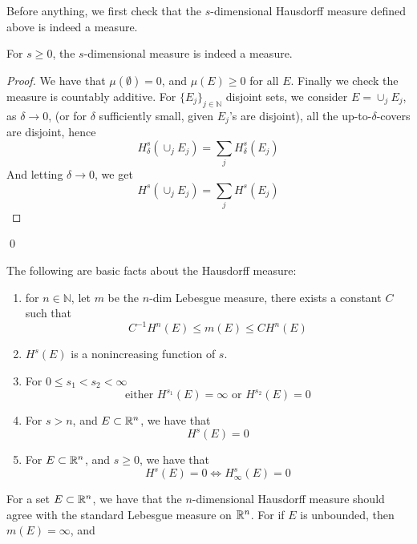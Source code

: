 Before anything, we first check that the $s$-dimensional Hausdorff measure defined above is indeed a measure.
\begin{proposition}
    For $s\geq 0$, the $s$-dimensional measure is indeed a measure.
\end{proposition}
\begin{proof}
    We have that $\mu(\emptyset)=0$, and $\mu(E)\geq 0$ for all $E$. Finally we check the measure is countably additive. For $\{E_j\}_{j\in\mathbb{N}}$ disjoint sets, we consider $E=\cup_jE_j$, as $\delta\to 0$, (or for $\delta$ sufficiently small, given $E_j$'s are disjoint), all the up-to-$\delta$-covers are disjoint, hence
    \begin{equation*}
        H_\delta^s(\cup_jE_j)=\sum_j H_\delta^s(E_j)
    \end{equation*}
    And letting $\delta\to 0$, we get
    \begin{equation*}
        H^s(\cup_jE_j)=\sum_jH^s(E_j)
    \end{equation*}
\end{proof}
\qed

\begin{proposition}
    The following are basic facts about the Hausdorff measure:
    \begin{enumerate}
        \item for $n\in\mathbb{N}$, let $m$ be the $n$-dim Lebesgue measure, there exists a constant $C$ such that
        \begin{equation*}
            C^{-1}H^n(E)\leq m(E)\leq CH^n(E)
        \end{equation*}
        \item $H^s(E)$ is a nonincreasing function of $s$.
        \item For $0\leq s_1<s_2<\infty$
        \begin{equation*}
            \text{either } H^{s_1}(E)=\infty \text{ or } H^{s_2}(E)=0
        \end{equation*}
        \item For $s>n$, and $E\subset\mathbb{R}^n$, we have that
        \begin{equation*}
            H^s(E)=0
        \end{equation*}
        \item For $E\subset\mathbb{R}^n$, and $s\geq 0$, we have that
        \begin{equation*}
            H^s(E)=0 \iff H_\infty^s(E)=0
        \end{equation*}
    \end{enumerate}
\end{proposition}
\begin{example}
    For a set $E\subset\mathbb{R}^n$, we have that the $n$-dimensional Hausdorff measure should agree with the standard Lebesgue measure on $\mathbb{R}^n$. For if $E$ is unbounded, then $m(E)=\infty$, and 
\end{example}


